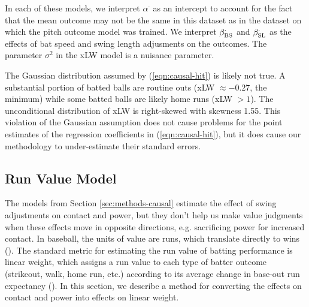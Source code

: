 \documentclass{article}
\begin{document}
      In each of these models, we interpret $\alpha^\cdot$ as an intercept to account for the fact that the mean outcome may not be the same in this dataset as in the dataset on which the pitch outcome model was trained. We interpret $\beta_{\mbox{\scriptsize BS}}^{\cdot}$ and $\beta_{\mbox{\scriptsize SL}}^{\cdot}$ as the effects of bat speed and swing length adjusments on the outcomes. The parameter $\sigma^2$ in the xLW model is a nuisance parameter.

      The Gaussian distribution assumed by (\ref{eqn:causal-hit}) is likely not true. A substantial portion of batted balls are routine outs (xLW $\approx -0.27$, the minimum) while some batted balls are likely home runs (xLW $> 1$). The unconditional distribution of xLW is right-skewed with skewness 1.55. This violation of the Gaussian assumption does not cause problems for the point estimates of the regression coefficients in (\ref{eqn:causal-hit}), but it does cause our methodology to under-estimate their standard errors.

    \subsection{Run Value Model}
    \label{sec:methods-value}

      The models from Section \ref{sec:methods-causal} estimate the effect of swing adjustments on contact and power, but they don't help us make value judgments when these effects move in opposite directions, e.g. sacrificing power for increased contact. In baseball, the units of value are runs, which translate directly to wins (\cite{james_bill_1983}). The standard metric for estimating the run value of batting performance is linear weight, which assigns a run value to each type of batter outcome (strikeout, walk, home run, etc.) according to its average change in base-out run expectancy (\cite{thorn_hidden_1984}). In this section, we describe a method for converting the effects on contact and power into effects on linear weight.
\end{document}
